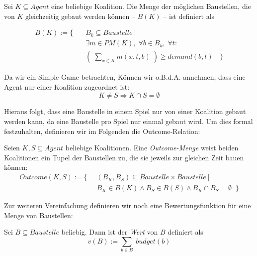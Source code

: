 \documentclass[sigconf]{acmart}
\theoremstyle{break}
\begin{document}
\begin{definition}
  Sei $K\subseteq Agent$ eine beliebige Koalition. Die Menge der möglichen Baustellen, die von $K$ gleichzeitig gebaut werden können -- $B(K)$ -- ist definiert als

  \begin{align}
     B(K) := \{\quad &B_k \subseteq Baustelle\ | \\
     &\exists m\in PM(K), \;\forall b\in B_k, \;\forall t: \\
     &\left(\; \sum_{x\in K}m(x,t,b) \;\right)\geq demand(b, t) \quad\}
  \end{align}

\end{definition}

\noindent
Da wir ein Simple Game betrachten, Können wir o.B.d.A. annehmen, dass eine Agent nur einer Koalition zugeordnet ist:
\begin{equation}
  K\neq S \Rightarrow K\cap S =\emptyset \label{koalitiondisjunct}
\end{equation}

\noindent
Hieraus folgt, dass eine Baustelle in einem Spiel nur von einer Koalition gebaut werden kann, da eine Baustelle pro Spiel nur einmal gebaut wird. Um dies formal festzuhalten, definieren wir im Folgenden die Outcome-Relation:

\begin{definition}
  Seien $K, S \subseteq Agent$ beliebige Koalitionen. Eine \textit{Outcome-Menge} weist beiden Koalitionen ein Tupel der Baustellen zu, die sie jeweils zur gleichen Zeit bauen können:
\begin{align}
  Outcome(K,S) := \{ \; \;
  &(B_K,B_S)\subseteq Baustelle\times Baustelle\ | \\
  &B_K\in B(K) \land B_S\in B(S)\land B_K\cap B_S =\emptyset \;\;\}
\end{align}
\end{definition}

\noindent
Zur weiteren Vereinfachung definieren wir noch eine Bewertungsfunktion für eine Menge von Baustellen:

\begin{definition}
  Sei $B\subseteq Baustelle$ beliebig. Dann ist der \textit{Wert} von $B$ definiert als
  \begin{equation}
    v(B):=\sum_{b \in B} \; budget(b)
  \end{equation}
\end{definition}
\end{document}
